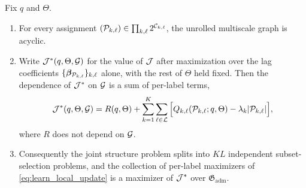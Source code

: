 \begin{proposition}
\label{prop:learn_decomposition}
Fix $q$ and $\Theta$.
\begin{enumerate}
\item For every assignment $({\mathcal{P}}_{k,\ell}) \in \prod_{k,\ell} 2^{{\mathcal{C}}_{k,\ell}}$, the unrolled
multiscale graph is acyclic.
\item Write ${\mathcal{J}}^{\ast}(q,\Theta,{\mathcal{G}})$ for the value of ${\mathcal{J}}$ after maximization over the lag
coefficients $\{{\boldsymbol{\beta}}_{{\mathcal{P}}_{k,\ell}}\}_{k,\ell}$ alone, with the rest of $\Theta$ held fixed.
Then the dependence of ${\mathcal{J}}^{\ast}$ on ${\mathcal{G}}$ is a sum of per-label terms,
\begin{align}
{\mathcal{J}}^{\ast}(q,\Theta,{\mathcal{G}})
=
R(q,\Theta)
+
\sum_{k=1}^{K} \sum_{\ell \in {\mathcal{L}}}
\Big[ Q_{k,\ell}({\mathcal{P}}_{k,\ell}; q,\Theta) - \lambda_k |{\mathcal{P}}_{k,\ell}| \Big],
\label{eq:learn_separable}
\end{align}
where $R$ does not depend on ${\mathcal{G}}$.
\item Consequently the joint structure problem splits into $K L$ independent subset-selection
problems, and the collection of per-label maximizers of \cref{eq:learn_local_update} is a
maximizer of ${\mathcal{J}}^{\ast}$ over $\mathfrak{G}_{\mathrm{adm}}$.
\end{enumerate}
\end{proposition}

